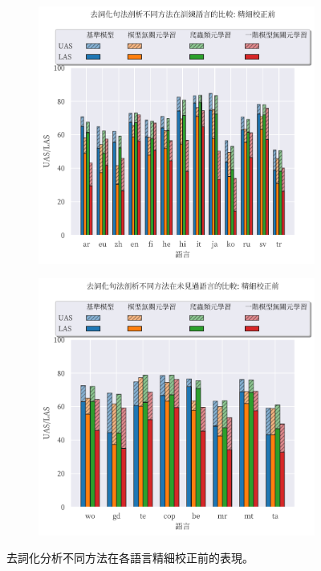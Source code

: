 \begin{figure}[htbp]
    \centering
    \begin{subfigure}[t]{0.8\textwidth}
        \centering
        \includegraphics[width=\textwidth]{figs/chapter3/delex/bar_zs_train_langs.pdf}
    \end{subfigure}
    \vspace{-12pt}
    \begin{subfigure}[t]{0.8\textwidth}
        \centering
        \includegraphics[width=\textwidth]{figs/chapter3/delex/bar_zs_test_langs.pdf}
    \end{subfigure}
    \caption{去詞化分析不同方法在各語言精細校正前的表現。}
    \label{fig:bar_zs}
\end{figure}